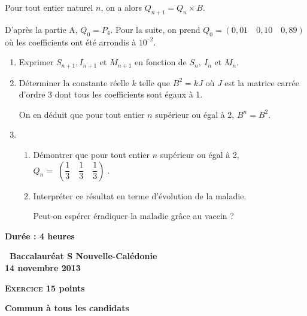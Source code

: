 \documentclass[10pt]{article}
\begin{document}
Pour tout  entier naturel $n$, on a alors $Q_{n+1}  = Q_{n} \times B$.

D'après la partie A, $Q_{0}  = P_{4}$. Pour la suite, on prend $Q_{0} = (0,01\quad  0,10\quad 0,89)$ où les coefficients ont été 
arrondis à $10^{–2}$.

\medskip
 
\begin{enumerate}
\item Exprimer $S_{n+1}, I_{n+1}$ et $M_{n+1}$ en fonction de $S_{n},\: I_{n}$ et $M_{n}$.
\item Déterminer la constante réelle $k$ telle que $B^2  = kJ$ où $J$ est la matrice carrée d'ordre 3 dont tous les coefficients sont égaux à 1.
 
On en déduit que pour tout entier $n$ supérieur ou égal à 2,  $B^n  = B^2$.
\item 
	\begin{enumerate}
		\item Démontrer que pour tout entier $n$ supérieur ou égal à 2, $Q_{n} = \left(\dfrac{1}{3}\quad \dfrac{1}{3}\quad 
\dfrac{1}{3}\right)$. 
		\item Interpréter ce résultat en terme d'évolution de la maladie. 
		
Peut-on espérer éradiquer la maladie grâce au vaccin ?
	\end{enumerate}
\end{enumerate}
\newpage
\hypertarget{Caledonienov}{}

\renewcommand \footrulewidth{.2pt}
\pagestyle{fancy}
\thispagestyle{empty}

\begin{center}\textbf{Durée : 4 heures}

\vspace{0,5cm}

{\Large\textbf{\decofourleft~Baccalauréat S  Nouvelle-Calédonie~\decofourright\\14 novembre 2013}}
\end{center}

\vspace{0,5cm}

\textbf{\textsc{Exercice 1}\hfill 5 points}

\textbf{Commun à tous les candidats}

\medskip
\end{document}
